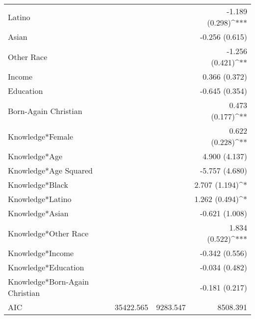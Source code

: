 \begin{tabular}{l D{)}{)}{13)3} D{)}{)}{13)3} D{)}{)}{13)3} }
Latino                             &                         &                         & -1.189 \; (0.298)^{***} \\
Asian                              &                         &                         & -0.256 \; (0.615)       \\
Other Race                         &                         &                         & -1.256 \; (0.421)^{**}  \\
Income                             &                         &                         & 0.366 \; (0.372)        \\
Education                          &                         &                         & -0.645 \; (0.354)       \\
Born-Again Christian               &                         &                         & 0.473 \; (0.177)^{**}   \\
Knowledge*Female                   &                         &                         & 0.622 \; (0.228)^{**}   \\
Knowledge*Age                      &                         &                         & 4.900 \; (4.137)        \\
Knowledge*Age Squared              &                         &                         & -5.757 \; (4.680)       \\
Knowledge*Black                    &                         &                         & 2.707 \; (1.194)^{*}    \\
Knowledge*Latino                   &                         &                         & 1.262 \; (0.494)^{*}    \\
Knowledge*Asian                    &                         &                         & -0.621 \; (1.008)       \\
Knowledge*Other Race               &                         &                         & 1.834 \; (0.522)^{***}  \\
Knowledge*Income                   &                         &                         & -0.342 \; (0.556)       \\
Knowledge*Education                &                         &                         & -0.034 \; (0.482)       \\
Knowledge*Born-Again Christian     &                         &                         & -0.181 \; (0.217)       \\
\midrule
AIC                                & 35422.565               & 9283.547                & 8508.391                \\

\end{tabular}
